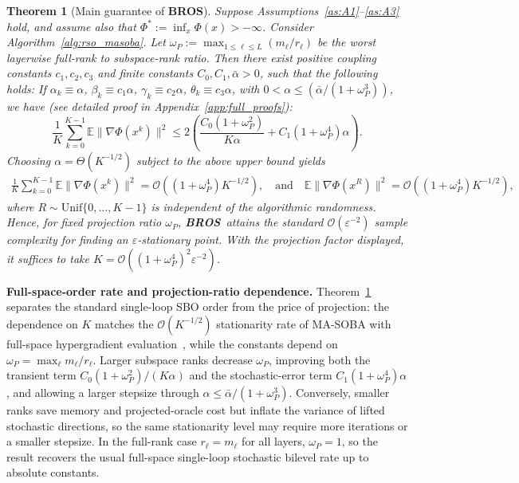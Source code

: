\documentclass{pkumelon}
\newenvironment{limbox}{\begin{limitationbox}}{\end{limitationbox}}
\theoremstyle{plain}
\newtheorem{theorem}{Theorem}
\newcommand{\E}{\mathbb{E}}
\newcommand{\oursname}{\textnormal{\textbf{BROS}}}
\newcommand{\ours}{\oursname\ }
\newcommand{\ourslast}{\oursname}
\begin{document}
\begin{limbox}
\begin{theorem}[Main guarantee of \ourslast]
\label{thm:bros_main}
Suppose Assumptions~\ref{as:A1}--\ref{as:A3} hold, and assume also that $\Phi^*:=\inf_x \Phi(x)>-\infty$. Consider Algorithm~\ref{alg:rso_masoba}. Let $\omega_P:=\max_{1\le \ell\le L}(m_\ell/r_\ell)$ be the worst layerwise full-rank to subspace-rank ratio. Then there exist positive coupling constants $c_1,c_2,c_3$ and finite constants $C_0,C_1,\bar\alpha>0$, such that the following holds: If $\alpha_k\equiv \alpha$, $\beta_k\equiv c_1\alpha$, $\gamma_k\equiv c_2\alpha$, $\theta_k\equiv c_3\alpha$, with $0<\alpha\le (\bar\alpha/(1+\omega_P^3))$, we have (see detailed proof in Appendix~\ref{app:full_proofs}):
\begin{equation}
\label{eq:bros_stationarity_rate}
\frac{1}{K}\sum_{k=0}^{K-1}\E\|\nabla\Phi(x^k)\|^2 \le 2\left( \frac{C_0(1+\omega_P^2)}{K\alpha} +C_1(1+\omega_P^4)\alpha \right).
\end{equation}
Choosing $\alpha=\Theta(K^{-1/2})$ subject to the above upper bound yields
\begin{equation*}
\begin{aligned}
\frac{1}{K}\sum_{k=0}^{K-1}\E\|\nabla\Phi(x^k)\|^2=\mathcal O\!\left((1+\omega_P^4)K^{-1/2}\right), \quad \text{and} \quad \E\|\nabla\Phi(x^R)\|^2=\mathcal O\!\left((1+\omega_P^4)K^{-1/2}\right),
\end{aligned}
\end{equation*}
where $R\sim\mathrm{Unif}\{0,\ldots,K-1\}$ is independent of the algorithmic randomness. Hence, for fixed projection ratio $\omega_P$, \ours attains the standard $\mathcal O(\varepsilon^{-2})$ sample complexity for finding an $\varepsilon$-stationary point. With the projection factor displayed, it suffices to take $K=\mathcal O((1+\omega_P^4)^2\varepsilon^{-2})$.
\end{theorem}
\end{limbox}

\textbf{Full-space-order rate and projection-ratio dependence.}
Theorem~\ref{thm:bros_main} separates the standard single-loop SBO order from the price of projection: the dependence on $K$ matches the $\mathcal O(K^{-1/2})$ stationarity rate of MA-SOBA with full-space hypergradient evaluation~\citep{chen2024optimal}, while the constants depend on $\omega_P=\max_\ell m_\ell/r_\ell$. Larger subspace ranks decrease $\omega_P$, improving both the transient term $C_0(1+\omega_P^2)/(K\alpha)$ and the stochastic-error term $C_1(1+\omega_P^4)\alpha$, and allowing a larger stepsize through $\alpha\le \bar\alpha/(1+\omega_P^3)$. Conversely, smaller ranks save memory and projected-oracle cost but inflate the variance of lifted stochastic directions, so the same stationarity level may require more iterations or a smaller stepsize. In the full-rank case $r_\ell=m_\ell$ for all layers, $\omega_P=1$, so the result recovers the usual full-space single-loop stochastic bilevel rate up to absolute constants.
\end{document}
